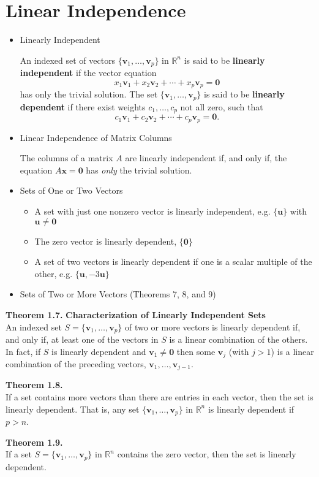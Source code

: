 \documentclass[10pt]{book}
\newenvironment{boxthm}{\begin{mdframed}[backgroundcolor=gray!30,nobreak=true]}{\end{mdframed}}
\newenvironment{boxdef}{\begin{mdframed}[backgroundcolor=gray!30,linewidth=0pt,nobreak=true]}{\end{mdframed}}
\newcommand{\R}{\mathbb{R}}
\newcommand{\vect}[1]{\ensuremath{\boldsymbol{\mathbf{#1}}}}
\newcommand{\Axz}{A\vect{x}=\vect{0}}
\begin{document}
\section{Linear Independence}
\begin{itemize}
\item Linearly Independent
\begin{boxdef}
	An indexed set of vectors $\{\vect{v}_1,\ldots,\vect{v}_p\}$ in $\R^n$ is said to be \textbf{linearly independent} if the vector equation
	$$ x_1\vect{v}_1 + x_2\vect{v}_2 + \cdots + x_p\vect{v}_p = \vect{0} $$
	has only the trivial solution. The set $\{\vect{v}_1,\ldots,\vect{v}_p\}$ is said to be \textbf{linearly dependent} if there exist weights $c_1,\ldots,c_p$ not all zero, such that
	$$ c_1\vect{v}_1 + c_2\vect{v}_2 + \cdots + c_p\vect{v}_p = \vect{0}. $$
\end{boxdef}
\item Linear Independence of Matrix Columns
\begin{boxdef}
	The columns of a matrix $A$ are linearly independent if, and only if, the equation $\Axz$ has \emph{only} the trivial solution.
\end{boxdef}
\item Sets of One or Two Vectors
	\begin{itemize}
		\item A set with just one nonzero vector is linearly independent, e.g. $\{\vect{u}\}$ with $\vect{u}\neq\vect{0}$
		\item The zero vector is linearly dependent, $\{\vect{0}\}$
		\item A set of two vectors is linearly dependent if one is a scalar multiple of the other, e.g. $\{\vect{u},-3\vect{u}\}$
	\end{itemize}
\item Sets of Two or More Vectors (Theorems 7, 8, and 9)
\end{itemize}

\begin{boxthm}
	\textbf{Theorem 1.7.}
	\textbf{Characterization of Linearly Independent Sets} \\
	An indexed set $S=\{\vect{v}_1,\ldots,\vect{v}_p\}$ of two or more vectors is linearly dependent if, and only if, at least one of the vectors in $S$ is a linear combination of the others. In fact, if $S$ is linearly dependent and $\vect{v}_1\neq\vect{0}$ then some $\vect{v}_j$ (with $j>1$) is a linear combination of the preceding vectors, $\vect{v}_1,\ldots,\vect{v}_{j-1}$.
\end{boxthm}
\begin{boxthm}
	\textbf{Theorem 1.8.} \\
	If a set contains more vectors than there are entries in each vector, then the set is linearly dependent. That is, any set $\{\vect{v}_1,\ldots,\vect{v}_p\}$ in $\R^n$ is linearly dependent if $p>n$.
\end{boxthm}
\begin{boxthm}
	\textbf{Theorem 1.9.} \\
	If a set $S=\{\vect{v}_1,\ldots,\vect{v}_p\}$ in $\R^n$ contains the zero vector, then the set is linearly dependent.
\end{boxthm}
\end{document}
